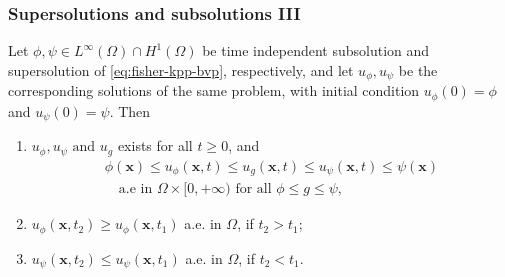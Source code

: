 \begin{frame}
    \frametitle{Supersolutions and subsolutions III}
    \begin{lemma}
        Let \(\phi, \psi \in L^\infty(\Omega) \cap H^1(\Omega)\) be time independent subsolution and supersolution of \eqref{eq:fisher-kpp-bvp}, respectively, and let \(u_\phi, u_\psi\) be the corresponding solutions of the same problem, with initial condition \(u_\phi(0) = \phi\) and \(u_\psi(0) = \psi\). Then
        \begin{enumerate}
            \item \(u_\phi, u_\psi \text{ and } u_g\) exists for all \(t \geq 0\), and 
            \begin{equation}
                \begin{split}
                    \phi(\bm{x}) \leq u_\phi(\bm{x}, t) \leq u_g(\bm{x}, t) \leq u_\psi(\bm{x}, t) \leq \psi(\bm{x}) \\ \quad \text{a.e in } \Omega \times [0, +\infty) \text{ for all }\phi \leq g \leq \psi,
                \end{split}
            \end{equation}
            \item \(u_\phi(\bm{x}, t_2) \geq u_\phi(\bm{x}, t_1)\) a.e. in \(\Omega\), if \(t_2 > t_1\);
            \item \(u_\psi(\bm{x}, t_2) \leq u_\psi(\bm{x}, t_1)\) a.e. in \(\Omega\), if \(t_2 < t_1\).
        \end{enumerate}
        \label{lem:10.21}
    \end{lemma}
\end{frame}